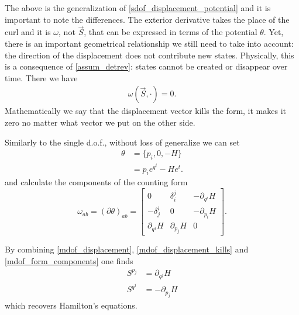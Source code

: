 \documentclass[10pt,twocolumn, nofootinbib]{revtex4-2}
\begin{document}
The above is the generalization of \ref{sdof_displacement_potential} and it is important to note the differences. The exterior derivative takes the place of the curl and it is $\omega$, not $\vec{S}$, that can be expressed in terms of the potential $\theta$. Yet, there is an important geometrical relationship we still need to take into account: the direction of the displacement does not contribute new states. Physically, this is a consequence of \ref{assum_detrev}: states cannot be created or disappear over time. There we have
\begin{align}\label{mdof_displacement_kills}
	\omega(\vec{S}, \cdot) = 0.
\end{align}
Mathematically we say that the displacement vector kills the form, it makes it zero no matter what vector we put on the other side.

Similarly to the single d.o.f., without loss of generalize we can set
\begin{equation}\label{mdof_potential_expression}
\begin{aligned}
	\theta &= \{p_i, 0, -H\} \\
	&= p_i e^{q^i} - H e^t.
\end{aligned}
\end{equation}
and calculate the components of the counting form
\begin{equation}\label{mdof_form_components}
	\omega_{ab} = (\partial\theta)_{ab} = \begin{bmatrix}
		0 & \delta^j_i & - \partial_{q^i} H \\
		-\delta^i_j & 0 & - \partial_{p_i} H \\
		\partial_{q^j} H & \partial_{p_j} H & 0
	\end{bmatrix}.
\end{equation}

By combining \ref{mdof_displacement}, \ref{mdof_displacement_kills} and \ref{mdof_form_components} one finds
\begin{equation}\label{mdof_Ham_eq}
\begin{aligned}
	S^{p_j} &= \partial_{q^j} H \\
	S^{q^j} &= - \partial_{p_j} H
\end{aligned}
\end{equation}
which recovers Hamilton's equations.
\end{document}
